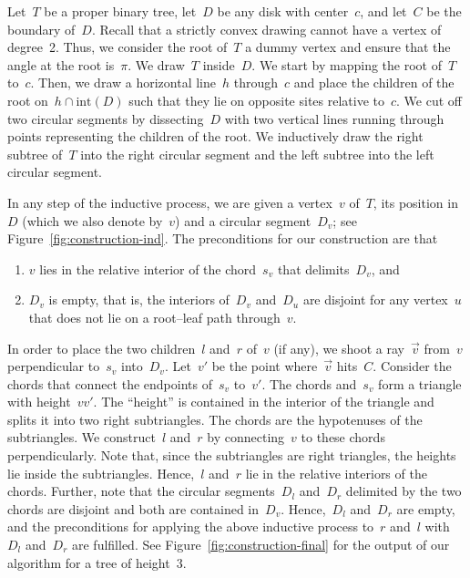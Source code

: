 \documentclass[a4paper,11pt]{article}
\theoremstyle{plain}
\begin{document}
Let~$T$ be a proper binary tree, let~$D$ be any disk with center~$c$,
and let~$C$ be the boundary of~$D$.  Recall that a strictly convex
drawing cannot have a vertex of degree~2.  Thus, we consider the root
of~$T$ a dummy vertex and ensure that the angle at the root
is~$\pi$.  We draw~$T$ inside~$D$.  We start by  
mapping the root of~$T$ to~$c$.  Then, we draw a horizontal line~$h$
through~$c$ and place the children of the root on~$h \cap
\text{int}(D)$ such that they lie on opposite sites relative to~$c$.
We cut off two circular segments by dissecting~$D$ with two vertical
lines running through points representing the children of the root.
We inductively draw the right subtree of~$T$ into the right circular
segment and the left subtree into the left circular segment.

In any step of the inductive process, we are given a vertex~$v$
of~$T$, its position in~$D$ (which we also denote by~$v$) and a 
circular segment~$D_v$; see Figure~\ref{fig:construction-ind}.  
The preconditions for our construction are that
\begin{enumerate}[label=(\roman*)]
  \item $v$ lies in the relative interior of the chord~$s_v$ that 
    delimits~$D_v$, and
  \item $D_v$ is empty, that is, the interiors of~$D_v$ and~$D_u$ are disjoint 
    for any vertex~$u$ that does not lie on a root--leaf path through~$v$.
\end{enumerate}
In order to place the two children~$l$ and~$r$ of~$v$ (if any), we
shoot a ray~$\vec{v}$ from~$v$ perpendicular to~$s_v$ into~$D_v$.
Let~$v'$ be the point where~$\vec{v}$ hits~$C$.  Consider the chords
that connect the endpoints of~$s_v$ to~$v'$.  The chords and~$s_v$ form
a triangle with height~$vv'$.  The ``height'' is contained in the interior of the 
triangle and splits it into two right subtriangles.  The chords are the
hypotenuses of the subtriangles.  We construct~$l$ and~$r$ by connecting~$v$ to
these chords perpendicularly.  Note that, since the subtriangles are right 
triangles, the heights lie inside the subtriangles.  Hence,~$l$ and~$r$ lie in 
the relative interiors of the chords.  Further, note that the circular 
segments~$D_l$ and~$D_r$ delimited by the two chords are disjoint and
both are contained in~$D_v$.  Hence,~$D_l$ and~$D_r$ are empty, and the
preconditions for applying the above inductive process to~$r$ and~$l$
with~$D_l$ and~$D_r$ are fulfilled.  See Figure~\ref{fig:construction-final} for 
the output of our algorithm for a tree of height~3.
\end{document}
